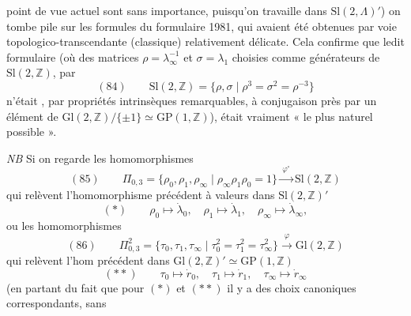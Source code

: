 \documentclass[11pt,a4paper]{article}
\begin{document}

point de vue actuel sont sans importance, puisqu'on travaille dans $\mathrm{Sl}(2,\Lambda)'$) on tombe pile sur les formules du formulaire 1981, qui avaient été obtenues par voie topologico-transcendante (classique) relativement délicate. Cela confirme que ledit formulaire (où  des matrices $\rho = \lambda_\infty^{-1}$ et $\sigma = \lambda_1$ choisies comme générateurs de $\mathrm{Sl}(2,\mathbb{Z})$, par
\[
(84)\qquad \mathrm{Sl}(2,\mathbb{Z}) = \{\rho, \sigma \mid \rho^3 = \sigma^2 = \rho^{-3}\}
\]
n'était ,  par propriétés intrinsèques  remarquables, à conjugaison près par un élément de $\mathrm{Gl}(2,\mathbb{Z})/\{\pm 1\} \simeq \mathrm{GP}(1,\mathbb{Z})$), était vraiment « le plus naturel possible ».

\emph{NB} Si on regarde les homomorphismes
\[
(85)\qquad \Pi_{0,3} = \{\rho_0, \rho_1, \rho_\infty \mid \rho_\infty \rho_1 \rho_0 = 1\} \xrightarrow{\ \varphi^{\circ}\ } \mathrm{Sl}(2,\mathbb{Z})
\]
qui relèvent l'homomorphisme précédent à valeurs dans $\mathrm{Sl}(2,\mathbb{Z})'$
\[
(*)\qquad \rho_0 \longmapsto \dot\lambda_0, \quad \rho_1 \longmapsto \dot\lambda_1, \quad \rho_\infty \longmapsto \dot\lambda_\infty ,
\]
ou les homomorphismes
\[
(86)\qquad \Pi^{2}_{0,3} = \{\tau_0, \tau_1, \tau_\infty \mid \tau_0^2 = \tau_1^2 = \tau_\infty^2\} \xrightarrow{\ \varphi\ } \mathrm{Gl}(2,\mathbb{Z})
\]
qui relèvent l'hom précédent dans $\mathrm{Gl}(2,\mathbb{Z})' \simeq \mathrm{GP}(1,\mathbb{Z})$
\[
(**)\qquad \tau_0 \longmapsto \dot r_0, \quad \tau_1 \longmapsto \dot r_1, \quad \tau_\infty \longmapsto \dot r_\infty
\]
(en partant du fait que pour $(*)$ et $(**)$ il y a des choix canoniques correspondants, sans \struck{\ill{}}
\end{document}
